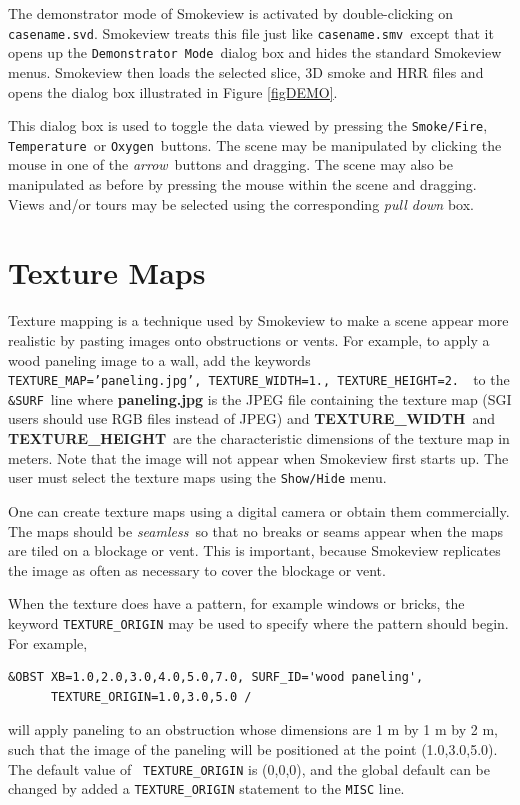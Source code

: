 \documentclass[11pt,twoside]{book}
\begin{document}
The demonstrator mode of Smokeview is activated by double-clicking on {\tt casename.svd}.  Smokeview treats this file just like {\tt casename.smv}\ except that it opens up the {\tt Demonstrator Mode}\ dialog box and hides the standard Smokeview menus.  Smokeview then
loads the selected slice, 3D smoke and HRR files and opens the dialog box illustrated in
Figure \ref{figDEMO}.

This dialog box is used to toggle the data viewed by pressing the {\tt Smoke/Fire},
{\tt Temperature}\ or {\tt Oxygen}\ buttons.  The scene may be manipulated by clicking the mouse in one of the
{\em arrow}\ buttons and dragging.  The scene may also
be manipulated as before by pressing the mouse within the scene and dragging.  Views and/or tours may be selected
using the corresponding {\em pull down} box.

\chapter{Texture Maps} Texture mapping is a technique used by
Smokeview to make a scene appear more realistic by pasting images
onto obstructions or vents. For example, to apply a wood paneling
image to a wall, add the keywords {\tt
TEXTURE\_MAP='paneling.jpg', TEXTURE\_WIDTH=1., TEXTURE\_HEIGHT=2.
}\ to the {\tt \&SURF}\ line where {\bf paneling.jpg} is the JPEG
file containing the texture map (SGI users should use RGB files
instead of JPEG) and {\bf TEXTURE\_WIDTH}\ and {\bf
TEXTURE\_HEIGHT}\ are the characteristic dimensions of the texture
map in meters. Note that the image will not appear when Smokeview
first starts up. The user must select the texture maps using the
{\tt Show/Hide} menu.

One can create texture maps using a digital camera or obtain them
commercially.  The maps should be {\em seamless}\ so that no
breaks or seams appear when the maps are tiled on a blockage or
vent.  This is important, because Smokeview replicates the image
as often as necessary to cover the blockage or vent.

When the texture does have a pattern, for example windows or
bricks, the keyword {\tt TEXTURE\_ORIGIN} may be used to specify
where the pattern should begin.  For example,
\begin{verbatim}
&OBST XB=1.0,2.0,3.0,4.0,5.0,7.0, SURF_ID='wood paneling',
      TEXTURE_ORIGIN=1.0,3.0,5.0 /
\end{verbatim}
\noindent will apply paneling to an obstruction whose dimensions
are 1 m by 1 m by 2 m, such that the image of the paneling will be
positioned at the point (1.0,3.0,5.0). The default value of {\tt
TEXTURE\_ORIGIN} is (0,0,0), and the global default can be changed
by added a {\tt TEXTURE\_ORIGIN} statement to the {\tt MISC} line.
\end{document}
